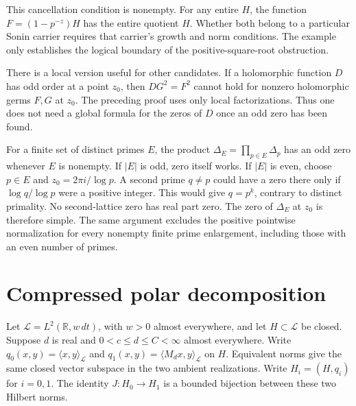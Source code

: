 \documentclass[11pt,letterpaper]{article}
\theoremstyle{definition}
\theoremstyle{remark}
\newcommand{\R}{\mathbb R}
\begin{document}
This cancellation condition is nonempty. For any entire $H$, the
function $F=(1-p^{-z})H$ has the entire quotient $H$. Whether
both belong to a particular Sonin carrier requires that carrier's
growth and norm conditions. The example only establishes the
logical boundary of the positive-square-root obstruction.

There is a local version useful for other candidates. If a
holomorphic function $D$ has odd order at a point $z_0$, then
$DG^2=F^2$ cannot hold for nonzero holomorphic germs $F,G$ at
$z_0$. The preceding proof uses only local factorizations. Thus
one does not need a global formula for the zeros of $D$ once
an odd zero has been found.

For a finite set of distinct primes $E$, the product
$\Delta_E=\prod_{p\in E}\Delta_p$ has an odd zero whenever $E$ is nonempty.
If $|E|$ is odd, zero itself works. If $|E|$ is even, choose
$p\in E$ and $z_0=2\pi i/\log p$. A second prime $q\ne p$
could have a zero there only if $\log q/\log p$ were a positive
integer. This would give $q=p^k$, contrary to distinct primality.
No second-lattice zero has real part zero. The zero of $\Delta_E$
at $z_0$ is therefore simple. The same argument excludes the
positive pointwise normalization for every nonempty finite
prime enlargement, including those with an even number of primes.

\section{Compressed polar decomposition}
\label{sec:compression}

Let $\mathcal L=L^2(\R,w\,dt)$, with $w>0$ almost everywhere,
and let $H\subset\mathcal L$ be closed. Suppose $d$ is real and
$0<c\leq d\leq C<\infty$ almost everywhere. Write
$q_0(x,y)=\langle x,y\rangle_{\mathcal L}$ and
$q_1(x,y)=\langle M_dx,y\rangle_{\mathcal L}$ on $H$.
Equivalent norms give the same closed vector subspace in the
two ambient realizations. Write $H_i=(H,q_i)$ for $i=0,1$.
The identity $J:H_0\to H_1$ is a
bounded bijection between these two Hilbert norms.
\end{document}
